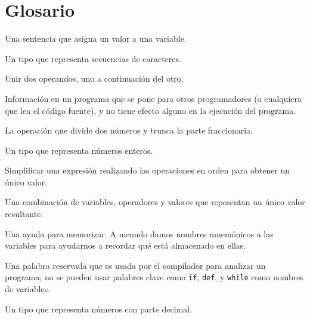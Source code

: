 

\section{Glosario}

\begin{descripción}

\item[asignación:]  Una sentencia que asigna un valor a una variable.

\item[cadena:] Un tipo que representa secuencias de caracteres.

\item[concatenar:]  Unir dos operandos, uno a continuación del otro.

\item[comentario:]  Información en un programa que se pone para otros
programadores (o cualquiera que lea el código fuente), y no tiene efecto alguno
en la ejecución del programa.

\item[división hacia abajo:] La operación que divide dos números y trunca la
parte fraccionaria.

\item[entero:] Un tipo que representa números enteros.

\item[evaluar:]  Simplificar una expresión realizando las operaciones
en orden para obtener un único valor.

\item[expresión:]  Una combinación de variables, operadores y valores que
repesentan un único valor resultante.

\item[mnemónico:] Una ayuda para memorizar. A menudo damos nombres mnemónicos a las variables
para ayudarnos a recordar qué está almacenado en ellas.

\item[palabra clave:]  Una palabra reservada que es usada por el compilador para analizar un
programa; no se pueden usar palabres clave como {\tt if}, {\tt  def}, y {\tt while} como
nombres de variables.

\item[punto flotante:] Un tipo que representa números con parte
decimal.


\end{descripción}
